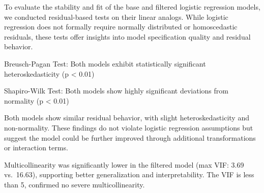 \documentclass[
  letterpaper,
  DIV=11,
  numbers=noendperiod]{scrartcl}
\newenvironment{Shaded}{\begin{snugshade}}{\end{snugshade}}
\newcommand{\AttributeTok}[1]{\textcolor[rgb]{0.40,0.45,0.13}{#1}}
\newcommand{\CommentTok}[1]{\textcolor[rgb]{0.37,0.37,0.37}{#1}}
\newcommand{\FunctionTok}[1]{\textcolor[rgb]{0.28,0.35,0.67}{#1}}
\newcommand{\NormalTok}[1]{\textcolor[rgb]{0.00,0.23,0.31}{#1}}
\newcommand{\OtherTok}[1]{\textcolor[rgb]{0.00,0.23,0.31}{#1}}
\newcommand{\SpecialCharTok}[1]{\textcolor[rgb]{0.37,0.37,0.37}{#1}}
\newcommand{\StringTok}[1]{\textcolor[rgb]{0.13,0.47,0.30}{#1}}
\begin{document}
To evaluate the stability and fit of the base and filtered logistic
regression models, we conducted residual-based tests on their linear
analogs. While logistic regression does not formally require normally
distributed or homoscedastic residuals, these tests offer insights into
model specification quality and residual behavior.

Breusch-Pagan Test: Both models exhibit statistically significant
heteroskedasticity (p \textless{} 0.01)

Shapiro-Wilk Test: Both models show highly significant deviations from
normality (p \textless{} 0.01)

Both models show similar residual behavior, with slight
heteroskedasticity and non-normality. These findings do not violate
logistic regression assumptions but suggest the model could be further
improved through additional transformations or interaction terms.

Multicollinearity was significantly lower in the filtered model (max
VIF: 3.69 vs.~16.63), supporting better generalization and
interpretability. The VIF is less than 5, confirmed no severe
multicollinearity.

\begin{Shaded}
\end{Shaded}
\end{document}
